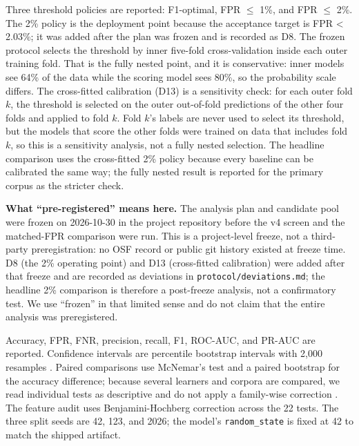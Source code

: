 \documentclass[preprint,11pt]{elsarticle}
\begin{document}
Three threshold policies are reported: F1-optimal, FPR $\le$ 1\%,
and FPR $\le$ 2\%. The 2\% policy is the deployment point because
the acceptance target is FPR \textless{} 2.03\%; it was added after the
plan was frozen and is recorded as D8. The frozen protocol selects the
threshold by inner five-fold cross-validation inside each outer training
fold. That is the fully nested point, and it is conservative: inner
models see 64\% of the data while the scoring model sees 80\%, so the
probability scale differs. The cross-fitted calibration (D13) is a
sensitivity check: for each outer fold \(k\), the threshold is selected
on the outer out-of-fold predictions of the other four folds and applied
to fold \(k\). Fold \(k\)'s labels are never used to select its
threshold, but the models that score the other folds were trained on
data that includes fold \(k\), so this is a sensitivity analysis, not a
fully nested selection. The headline comparison uses the cross-fitted
2\% policy because every baseline can be calibrated the same way; the
fully nested result is reported for the primary corpus as the stricter
check.

\textbf{What ``pre-registered'' means here.} The analysis plan and
candidate pool were frozen on 2026-10-30 in the project repository
before the v4 screen and the matched-FPR comparison were run. This is a
project-level freeze, not a third-party preregistration: no OSF record
or public git history existed at freeze time. D8 (the 2\% operating
point) and D13 (cross-fitted calibration) were added after that freeze
and are recorded as deviations in \texttt{protocol/\allowbreak{}deviations.\allowbreak{}md}; the
headline 2\% comparison is therefore a post-freeze analysis, not a
confirmatory test. We use ``frozen'' in that limited sense and do not
claim that the entire analysis was preregistered.

Accuracy, FPR, FNR, precision, recall, F1, ROC-AUC, and PR-AUC are
reported. Confidence intervals are percentile bootstrap intervals with
2,000 resamples \citep{efron1993introduction}. Paired comparisons use
McNemar's test \citep{mcnemar1947note} and a paired bootstrap for the
accuracy difference; because several learners and corpora are compared,
we read individual tests as descriptive and do not apply a family-wise
correction \citep{demsar2006statistical}. The feature audit uses
Benjamini-Hochberg correction across the 22 tests. The three split seeds
are 42, 123, and 2026; the model's \texttt{random\_\allowbreak{}state} is fixed at 42
to match the shipped artifact.
\end{document}
